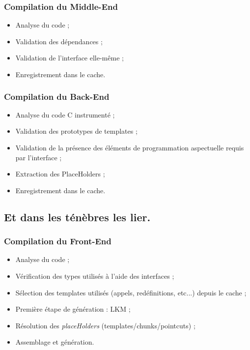 \documentclass[]{beamer}
\begin{document}
\begin{frame}
\frametitle{Compilation du Middle-End}
\begin{itemize}[<+->]
    \item Analyse du code ;
    \item Validation des dépendances ;
    \item Validation de l'interface elle-même ;
    \item Enregistrement dans le cache.
\end{itemize}
\end{frame}

\begin{frame}
\frametitle{Compilation du Back-End}
\begin{itemize}[<+->]
    \item Analyse du code C instrumenté ;
    \item Validation des prototypes de templates ;
    \item Validation de la présence des éléments de programmation aspectuelle
            requis par l'interface ;
    \item Extraction des PlaceHolders ;
    \item Enregistrement dans le cache.
\end{itemize}
\end{frame}

\subsection{Et dans les ténèbres les lier.}
\begin{frame}
\frametitle{Compilation du Front-End}
\begin{itemize}[<+->]
    \item Analyse du code ;
    \item Vérification des types utilisés à l'aide des interfaces ;
    \item Sélection des templates utilisés (appels, redéfinitions, etc...) depuis le cache ;
    \item Première étape de génération : LKM ;
    \item Résolution des \emph{placeHolders} (templates/chunks/pointcuts) ;
    \item Assemblage et génération.
\end{itemize}
\end{frame}
\end{document}
